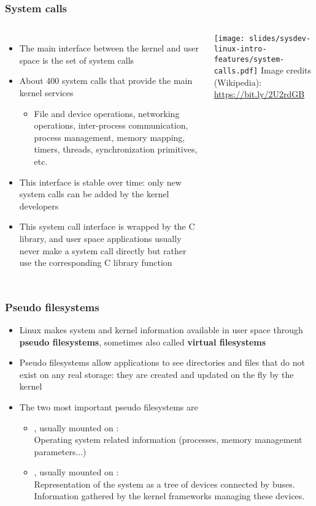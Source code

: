 \begin{frame}
  \frametitle{System calls}
  \begin{columns}
    \begin{itemize}
    \item The main interface between the kernel and user space is the set
      of system calls
    \item About 400 system calls that provide the main kernel services
      \begin{itemize}
      \item File and device operations, networking operations,
        inter-process communication, process management, memory mapping,
        timers, threads, synchronization primitives, etc.
      \end{itemize}
      \item This interface is stable over time: only new system calls can
        be added by the kernel developers
    \item This system call interface is wrapped by the C library, and
      user space applications usually never make a system call directly
      but rather use the corresponding C library function
    \end{itemize}
      \texttt{[image: slides/sysdev-linux-intro-features/system-calls.pdf]}
      \scriptsize
      Image credits (Wikipedia):\\
      \url{https://bit.ly/2U2rdGB}
    \end{columns}
\end{frame}

\begin{frame}
  \frametitle{Pseudo filesystems}
  \begin{itemize}
  \item Linux makes system and kernel information available in user
    space through {\bf pseudo filesystems}, sometimes also called {\bf
      virtual filesystems}
  \item Pseudo filesystems allow applications to see directories and
    files that do not exist on any real storage: they are created and
    updated on the fly by the kernel
  \item The two most important pseudo filesystems are
    \begin{itemize}
    \item {}, usually mounted on : \\
      Operating system related information (processes, memory
      management parameters...)
    \item {}, usually mounted on : \\
       Representation of the system as a tree of
       devices connected by buses. Information
       gathered by the kernel frameworks managing these devices.
    \end{itemize}
  \end{itemize}
\end{frame}
